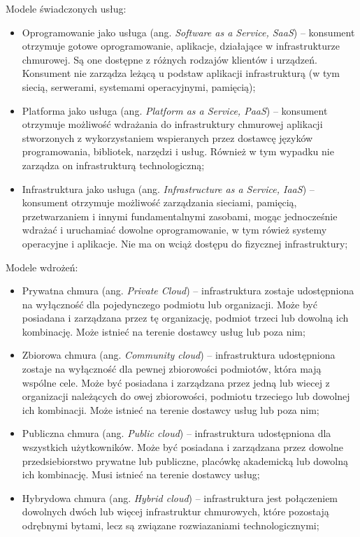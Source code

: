 \documentclass[12pt,a4paper,twoside]{article}
\begin{document}
Modele świadczonych usług:
\begin{itemize}
\item Oprogramowanie jako usługa (ang. \textit{Software as a Service, SaaS}) -- konsument otrzymuje gotowe oprogramowanie, aplikacje, działające w infrastrukturze chmurowej. Są one dostępne z różnych rodzajów klientów i urządzeń. Konsument nie zarządza leżącą u podstaw aplikacji infrastrukturą (w tym siecią, serwerami, systemami operacyjnymi, pamięcią);
\item Platforma jako usługa (ang. \textit{Platform as a Service, PaaS}) -- konsument otrzymuje możliwość wdrażania do infrastruktury chmurowej aplikacji stworzonych z wykorzystaniem wspieranych przez dostawcę języków programowania, bibliotek, narzędzi i usług. Również w tym wypadku nie zarządza on infrastrukturą technologiczną;
\item Infrastruktura jako usługa (ang. \textit{Infrastructure as a Service, IaaS}) -- konsument otrzymuje możliwość zarządzania sieciami, pamięcią, przetwarzaniem i innymi fundamentalnymi zasobami, mogąc jednocześnie wdrażać i uruchamiać dowolne oprogramowanie, w tym rówież systemy operacyjne i aplikacje. Nie ma on wciąż dostępu do fizycznej infrastruktury;
\end{itemize}

Modele wdrożeń:
\begin{itemize}
\item Prywatna chmura (ang. \textit{Private Cloud}) -- infrastruktura zostaje udostępniona na wyłączność dla pojedynczego podmiotu lub organizacji. Może być posiadana i zarządzana przez tę organizację, podmiot trzeci lub dowolną ich kombinację. Może istnieć na terenie dostawcy usług lub poza nim;
\item Zbiorowa chmura (ang. \textit{Community cloud}) -- infrastruktura udostępniona zostaje na wyłączność dla pewnej zbiorowości podmiotów, która mają wspólne cele. Może być posiadana i zarządzana przez jedną lub wiecej z organizacji należących do owej zbiorowości, podmiotu trzeciego lub dowolnej ich kombinacji. Może istnieć na terenie dostawcy usług lub poza nim;
\item Publiczna chmura (ang. \textit{Public cloud}) -- infrastruktura udostępniona dla wszystkich użytkowników. Może być posiadana i zarządzana przez dowolne przedsiebiorstwo prywatne lub publiczne, placówkę akademicką lub dowolną ich kombinację. Musi istnieć na terenie dostawcy usług;
\item Hybrydowa chmura (ang. \textit{Hybrid cloud}) -- infrastruktura jest połączeniem dowolnych dwóch lub więcej infrastruktur chmurowych, które pozostają odrębnymi bytami, lecz są związane rozwiazaniami technologicznymi;
\end{itemize}
\end{document}
